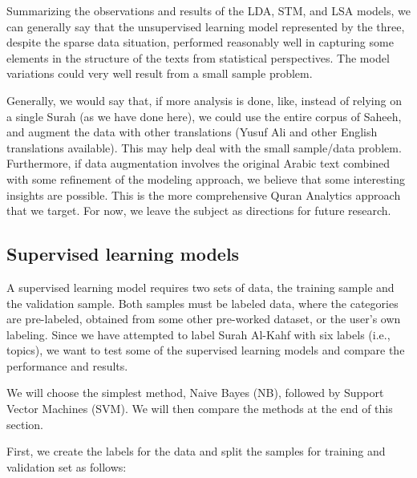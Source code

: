 \documentclass[
]{article}
\begin{document}
Summarizing the observations and results of the LDA, STM, and LSA models, we can generally say that the unsupervised learning model represented by the three, despite the sparse data situation, performed reasonably well in capturing some elements in the structure of the texts from statistical perspectives. The model variations could very well result from a small sample problem.

Generally, we would say that, if more analysis is done, like, instead of relying on a single Surah (as we have done here), we could use the entire corpus of Saheeh, and augment the data with other translations (Yusuf Ali and other English translations available). This may help deal with the small sample/data problem. Furthermore, if data augmentation involves the original Arabic text combined with some refinement of the modeling approach, we believe that some interesting insights are possible. This is the more comprehensive Quran Analytics approach that we target. For now, we leave the subject as directions for future research.

\hypertarget{supervised-learning-models}{%
\subsection{Supervised learning models}\label{supervised-learning-models}}

A supervised learning model requires two sets of data, the training sample and the validation sample. Both samples must be labeled data, where the categories are pre-labeled, obtained from some other pre-worked dataset, or the user's own labeling. Since we have attempted to label Surah Al-Kahf with six labels (i.e., topics), we want to test some of the supervised learning models and compare the performance and results.

We will choose the simplest method, Naive Bayes (NB), followed by Support Vector Machines (SVM). We will then compare the methods at the end of this section.

First, we create the labels for the data and split the samples for training and validation set as follows:

\footnotesize
\end{document}
